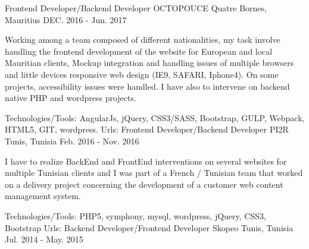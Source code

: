\begin{cventries}
  \techentries
    {Frontend Developer/Backend Developer}
    {OCTOPOUCE}
    {Quatre Bornes, Mauritius}
    {DEC. 2016 - Jun. 2017}
    {
      \begin{cvitems}
        \item {Working among a team composed of different nationalities, my task involve handling the frontend development of the website for European and local Mauritian clients, Mockup integration and handling issues of multiple browsers and little devices responsive web design (IE9, SAFARI, Iphone4). On some projects, accessibility issues were handled. I have also to intervene on backend native PHP and wordpress projects.}
      \end{cvitems}
    }
    {\textcolor{awesome}{Technologies/Tools: } {\color{graytext}}  {AngularJs, jQuery, CSS3/SASS, Bootstrap, GULP, Webpack, HTML5, GIT, wordpress.}}
    {Urls:} 
    { \href{http://www.helloagency.com/}{} \break
     \href{http://anahita.mu/}{} \break
     \href{http://publicis-dashboard.octopouce.mu/en/}{}\break
    }
  \techentries
    {Frontend Developer/Backend Developer}
    {PI2R}
    {Tunis, Tunisia}
    {Feb. 2016 - Nov. 2016}
    {
      \begin{cvitems}
        \item {I have to realize BackEnd and FrontEnd interventions on several websites for multiple Tunisian clients and I was part of a French / Tunisian team that worked on a delivery project concerning the development of a customer web content management system. }
      \end{cvitems}
    }
    {\textcolor{awesome}{Technologies/Tools: } {\color{graytext}}  {PHP5, symphony, mysql, wordpress, jQuery, CSS3, Bootstrap}}
    {Urls:} 
    {\href{http://www.ozeol.com/en/}{} \break
    \href{http://www.milddream.com/fr/ }{} \break
    }    
  \techentries
    {Backend Developer/Frontend Developer}
    {Skopeo}
    {Tunis, Tunisia}
    {Jul. 2014 - May. 2015}

\end{cventries}
